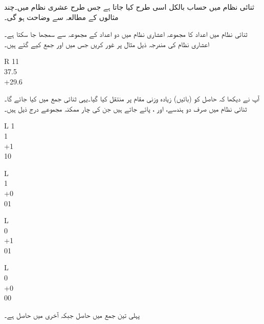 	ثنائی نظام میں حساب بالکل اسی طرح کیا جاتا ہے جس طرح عشری  نظام میں۔چند مثالوں کے مطالعہ سے وضاحت ہو گی۔
	
	ثنائی نظام میں اعداد کا مجموعہ اعشاری نظام میں دو اعداد کے مجموعہ سے سمجھا جا سکتا ہے۔اعشاری نظام کی مندرجہ ذیل مثال پر غور کریں جس میں  اور  جمع کیے گئے ہیں۔
\begin{center}
\begin{otherlanguage}{english}
\begin{tabular}{R}
11\phantom{.5}\\
37.5\\
+29.6\\
\end{tabular}
\end{otherlanguage}
\end{center}
آپ نے دیکھا کہ حاصل کو (بائیں) زیادہ وزنی مقام پر منتقل کیا گیا۔یہی ثنائی جمع میں کیا جائے گا۔ ثنائی نظام میں صرف دو ہندسے،  اور ، پائے جاتے ہیں جن کی چار ممکنہ مجموعے درج ذیل ہیں۔
\begin{center}
\begin{otherlanguage}{english}
\begin{tabular}{L}
\phantom{1}1\\
\phantom{+}1\\
+1\\
\midrule
\phantom{1}10
\end{tabular}\quad\quad
\begin{tabular}{L}
\phantom{11}\\
\phantom{+}1\\
+0\\
\midrule
\phantom{1}01
\end{tabular}\quad\quad
\begin{tabular}{L}
\phantom{11}\\
\phantom{+}0\\
+1\\
\midrule
\phantom{1}01
\end{tabular}\quad\quad
\begin{tabular}{L}
\phantom{11}\\
\phantom{+}0\\
+0\\
\midrule
\phantom{1}00
\end{tabular}
\end{otherlanguage}
\end{center}

پہلی تین جمع میں حاصل  جبکہ آخری میں حاصل  ہے۔

